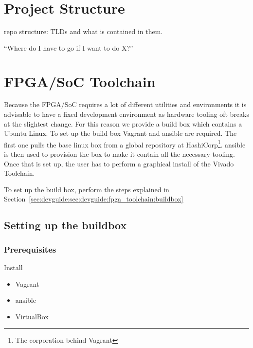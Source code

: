 \chapter{Project Structure} %
\label{ch:devguide:project_structure}

repo structure: TLDs and what is contained in them.

``Where do I have to go if I want to do X?''

\chapter{FPGA/SoC Toolchain} %
\label{ch:devguide:fpga_toolchain}

Because the FPGA/SoC requires a lot of different utilities and environments it is advisable to have a fixed development environment as hardware tooling oft breaks at the slightest change.
For this reason we provide a build box which contains a Ubuntu Linux. To set up the build box Vagrant and ansible are required.
The first one pulls the base linux box from a global repository at HashiCorp\footnote{The corporation behind Vagrant}. ansible is then used to provision the box to make it contain all the necessary tooling. Once that is set up, the user has to perform a graphical install of the Vivado Toolchain.

To set up the build box, perform the steps explained in Section~\ref{sec:devguide:sec:devguide:fpga_toolchain:buildbox}

\section{Setting up the buildbox}
\label{sec:devguide:fpga_toolchain:buildbox}

\subsection*{Prerequisites}

Install

\begin{itemize}
    \item Vagrant
    \item ansible
    \item VirtualBox
\end{itemize}

